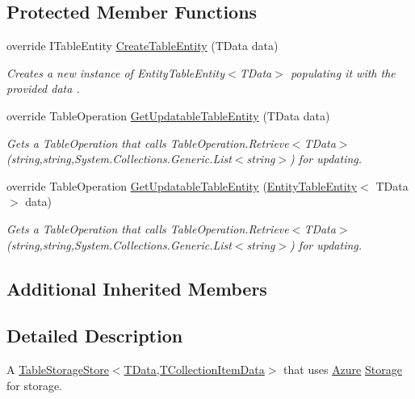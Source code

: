 \subsection*{Protected Member Functions}
\begin{DoxyCompactItemize}
\item 
override I\+Table\+Entity \hyperlink{classCqrs_1_1Azure_1_1BlobStorage_1_1DataStores_1_1TableStorageDataStore_ac28ce10858480acc61d3a3df4fb3dae4_ac28ce10858480acc61d3a3df4fb3dae4}{Create\+Table\+Entity} (T\+Data data)
\begin{DoxyCompactList}\small\item\em Creates a new instance of Entity\+Table\+Entity$<$\+T\+Data$>$ populating it with the provided {\itshape data} . \end{DoxyCompactList}\item 
override Table\+Operation \hyperlink{classCqrs_1_1Azure_1_1BlobStorage_1_1DataStores_1_1TableStorageDataStore_aa4dc1bfeeb55483b68d8af3414000f7a_aa4dc1bfeeb55483b68d8af3414000f7a}{Get\+Updatable\+Table\+Entity} (T\+Data data)
\begin{DoxyCompactList}\small\item\em Gets a Table\+Operation that calls Table\+Operation.\+Retrieve$<$\+T\+Data$>$(string,string,\+System.\+Collections.\+Generic.\+List$<$string$>$) for updating. \end{DoxyCompactList}\item 
override Table\+Operation \hyperlink{classCqrs_1_1Azure_1_1BlobStorage_1_1DataStores_1_1TableStorageDataStore_a2a6af1eed637f7ac828078a883881fd3_a2a6af1eed637f7ac828078a883881fd3}{Get\+Updatable\+Table\+Entity} (\hyperlink{classCqrs_1_1Azure_1_1BlobStorage_1_1EntityTableEntity}{Entity\+Table\+Entity}$<$ T\+Data $>$ data)
\begin{DoxyCompactList}\small\item\em Gets a Table\+Operation that calls Table\+Operation.\+Retrieve$<$\+T\+Data$>$(string,string,\+System.\+Collections.\+Generic.\+List$<$string$>$) for updating. \end{DoxyCompactList}\end{DoxyCompactItemize}
\subsection*{Additional Inherited Members}


\subsection{Detailed Description}
A \hyperlink{classCqrs_1_1Azure_1_1BlobStorage_1_1TableStorageStore_aabc36bc46ffb22b716cc7769a641cfab_aabc36bc46ffb22b716cc7769a641cfab}{Table\+Storage\+Store$<$\+T\+Data,\+T\+Collection\+Item\+Data$>$} that uses \hyperlink{namespaceCqrs_1_1Azure}{Azure} \hyperlink{namespaceCqrs_1_1Azure_1_1Storage}{Storage} for storage. 


